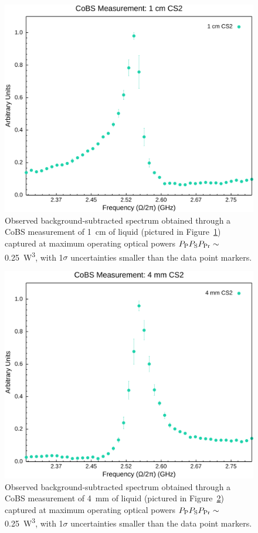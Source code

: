 \begin{figure}[t]
  \centering
  \hspace{-2em}\includegraphics[width=.85\textwidth]{figs/4-Raman/CoBS Measurement: 1 cm CS2.png}
  \caption{Observed background-subtracted spectrum obtained through a \ac{CoBS} measurement of \SI{1}{\centi\meter} of liquid  (pictured in Figure~\ref{fig:Raman:1cmCS2}) captured at maximum operating optical powers \(P_{\rm P}P_{\rm S}P_{\rm Pr} \sim\) \SI{0.25}{\cubic\watt}, with 1\(\sigma\) uncertainties smaller than the data point markers.}
  \label{fig:Raman:1cmCS2}
\end{figure}

\begin{figure}[t]
  \centering
  \hspace{-2em}\includegraphics[width=.85\textwidth]{figs/4-Raman/CoBS Measurement: 4 mm CS2.png}
  \caption{Observed background-subtracted spectrum obtained through a \ac{CoBS} measurement of \SI{4}{\milli\meter} of liquid  (pictured in Figure~\ref{fig:Raman:4mmCS2}) captured at maximum operating optical powers \(P_{\rm P}P_{\rm S}P_{\rm Pr} \sim\) \SI{0.25}{\cubic\watt}, with 1\(\sigma\) uncertainties smaller than the data point markers.}
  \label{fig:Raman:4mmCS2}
\end{figure}

